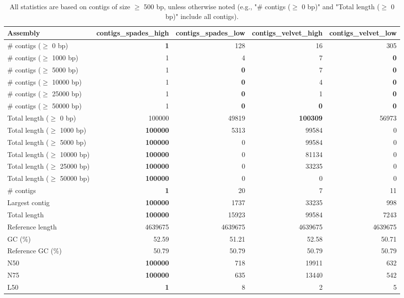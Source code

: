 \documentclass[12pt,a4paper]{article}
\begin{document}
\begin{table}[ht]
\begin{center}
\caption{All statistics are based on contigs of size $\geq$ 500 bp, unless otherwise noted (e.g., "\# contigs ($\geq$ 0 bp)" and "Total length ($\geq$ 0 bp)" include all contigs).}
\begin{tabular}{|l*{4}{|r}|}
\hline
Assembly & contigs\_spades\_high & contigs\_spades\_low & contigs\_velvet\_high & contigs\_velvet\_low \\ \hline
\# contigs ($\geq$ 0 bp) & {\bf 1} & 128 & 16 & 305 \\ \hline
\# contigs ($\geq$ 1000 bp) & 1 & 4 & 7 & {\bf 0} \\ \hline
\# contigs ($\geq$ 5000 bp) & 1 & {\bf 0} & 7 & {\bf 0} \\ \hline
\# contigs ($\geq$ 10000 bp) & 1 & {\bf 0} & 4 & {\bf 0} \\ \hline
\# contigs ($\geq$ 25000 bp) & 1 & {\bf 0} & 1 & {\bf 0} \\ \hline
\# contigs ($\geq$ 50000 bp) & 1 & {\bf 0} & {\bf 0} & {\bf 0} \\ \hline
Total length ($\geq$ 0 bp) & 100000 & 49819 & {\bf 100309} & 56973 \\ \hline
Total length ($\geq$ 1000 bp) & {\bf 100000} & 5313 & 99584 & 0 \\ \hline
Total length ($\geq$ 5000 bp) & {\bf 100000} & 0 & 99584 & 0 \\ \hline
Total length ($\geq$ 10000 bp) & {\bf 100000} & 0 & 81134 & 0 \\ \hline
Total length ($\geq$ 25000 bp) & {\bf 100000} & 0 & 33235 & 0 \\ \hline
Total length ($\geq$ 50000 bp) & {\bf 100000} & 0 & 0 & 0 \\ \hline
\# contigs & {\bf 1} & 20 & 7 & 11 \\ \hline
Largest contig & {\bf 100000} & 1737 & 33235 & 998 \\ \hline
Total length & {\bf 100000} & 15923 & 99584 & 7243 \\ \hline
Reference length & 4639675 & 4639675 & 4639675 & 4639675 \\ \hline
GC (\%) & 52.59 & 51.21 & 52.58 & 50.71 \\ \hline
Reference GC (\%) & 50.79 & 50.79 & 50.79 & 50.79 \\ \hline
N50 & {\bf 100000} & 718 & 19911 & 632 \\ \hline
N75 & {\bf 100000} & 635 & 13440 & 542 \\ \hline
L50 & {\bf 1} & 8 & 2 & 5 \\ \hline

\end{tabular}
\end{center}
\end{table}
\end{document}
